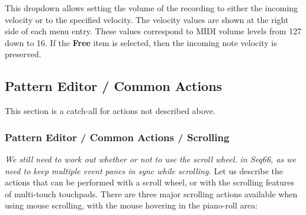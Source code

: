    This dropdown allows setting the volume of the recording to either the
   incoming velocity or to the specified velocity.
   The velocity values are shown at the right side of each menu entry.
   These values correspond to MIDI volume levels from 127 down to 16.
   If the \textbf{Free} item is selected, then the incoming note velocity is
   preserved.

\subsection{Pattern Editor / Common Actions}
\label{subsec:pattern_editor_common}

   This section is a catch-all for actions not described above.

\subsubsection{Pattern Editor / Common Actions / Scrolling}
\label{subsec:pattern_editor_scrolling}

   \textsl{We still need to work out whether or not to use the scroll wheel.
   in Seq66, as we need to keep multiple event panes in sync while scrolling.}
   Let us describe the actions that can be performed with a
   scroll wheel, or with the scrolling features of multi-touch touchpads.
   There are three major scrolling actions available when using mouse
   scrolling, with the mouse hovering in the piano-roll area:

